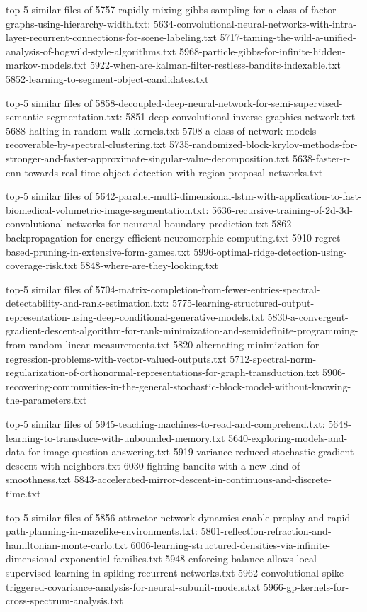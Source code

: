 \documentclass[11pt]{article}
\begin{document}
top-5 similar files of
5757-rapidly-mixing-gibbs-sampling-for-a-class-of-factor-graphs-using-hierarchy-width.txt:
5634-convolutional-neural-networks-with-intra-layer-recurrent-connections-for-scene-labeling.txt
5717-taming-the-wild-a-unified-analysis-of-hogwild-style-algorithms.txt
5968-particle-gibbs-for-infinite-hidden-markov-models.txt
5922-when-are-kalman-filter-restless-bandits-indexable.txt
5852-learning-to-segment-object-candidates.txt

top-5 similar files of
5858-decoupled-deep-neural-network-for-semi-supervised-semantic-segmentation.txt:
5851-deep-convolutional-inverse-graphics-network.txt
5688-halting-in-random-walk-kernels.txt
5708-a-class-of-network-models-recoverable-by-spectral-clustering.txt
5735-randomized-block-krylov-methods-for-stronger-and-faster-approximate-singular-value-decomposition.txt
5638-faster-r-cnn-towards-real-time-object-detection-with-region-proposal-networks.txt

top-5 similar files of
5642-parallel-multi-dimensional-lstm-with-application-to-fast-biomedical-volumetric-image-segmentation.txt:
5636-recursive-training-of-2d-3d-convolutional-networks-for-neuronal-boundary-prediction.txt
5862-backpropagation-for-energy-efficient-neuromorphic-computing.txt
5910-regret-based-pruning-in-extensive-form-games.txt
5996-optimal-ridge-detection-using-coverage-risk.txt
5848-where-are-they-looking.txt

top-5 similar files of
5704-matrix-completion-from-fewer-entries-spectral-detectability-and-rank-estimation.txt:
5775-learning-structured-output-representation-using-deep-conditional-generative-models.txt
5830-a-convergent-gradient-descent-algorithm-for-rank-minimization-and-semidefinite-programming-from-random-linear-measurements.txt
5820-alternating-minimization-for-regression-problems-with-vector-valued-outputs.txt
5712-spectral-norm-regularization-of-orthonormal-representations-for-graph-transduction.txt
5906-recovering-communities-in-the-general-stochastic-block-model-without-knowing-the-parameters.txt

top-5 similar files of
5945-teaching-machines-to-read-and-comprehend.txt:
5648-learning-to-transduce-with-unbounded-memory.txt
5640-exploring-models-and-data-for-image-question-answering.txt
5919-variance-reduced-stochastic-gradient-descent-with-neighbors.txt
6030-fighting-bandits-with-a-new-kind-of-smoothness.txt
5843-accelerated-mirror-descent-in-continuous-and-discrete-time.txt

top-5 similar files of
5856-attractor-network-dynamics-enable-preplay-and-rapid-path-planning-in-mazelike-environments.txt:
5801-reflection-refraction-and-hamiltonian-monte-carlo.txt
6006-learning-structured-densities-via-infinite-dimensional-exponential-families.txt
5948-enforcing-balance-allows-local-supervised-learning-in-spiking-recurrent-networks.txt
5962-convolutional-spike-triggered-covariance-analysis-for-neural-subunit-models.txt
5966-gp-kernels-for-cross-spectrum-analysis.txt
\end{document}
